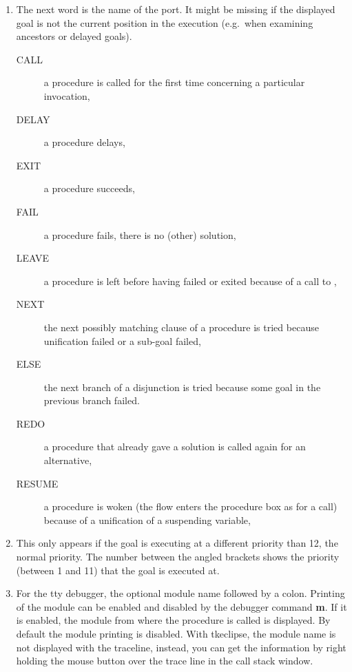 \begin{enumerate}
\item The next word is the name of the port.
It might be missing if the displayed goal is not the current position
in the execution (e.g.\ when examining ancestors or delayed goals).

\begin{description}
\item[CALL] a procedure is called for the first time concerning a particular
invocation,

\item[DELAY] a procedure delays,

\item[EXIT] a procedure succeeds,

\item[FAIL] a procedure fails, there is no (other) solution,

\item[LEAVE] a procedure is left before having failed or exited because
of a call to ,

\item[NEXT] the next possibly matching clause of a procedure is tried
because unification failed or a sub-goal failed,

\item[ELSE] the next branch of a disjunction is tried because some goal
in the previous branch failed.

\item[REDO] a procedure that already gave a solution is called again for
an alternative,

\item[RESUME] a procedure is woken (the flow enters the procedure box as for
a call) because of a unification of a suspending variable,


\end{description}

\item This only appears if the goal is executing at a different priority
  than 12, the normal priority. The number between the angled brackets
  shows the priority (between 1 and 11) that the  goal is executed at. 

\item For the tty debugger, the optional module name followed by a colon.
Printing of the module can be enabled and disabled by the debugger
command {\bf m}. 
If it is enabled, the module from where the procedure is called is
displayed.  By default the module printing is disabled. With tkeclipse, the
module name is not displayed with the traceline, instead, you can get the
information by right holding the mouse button over the trace line in the
call stack window.


\end{enumerate}
